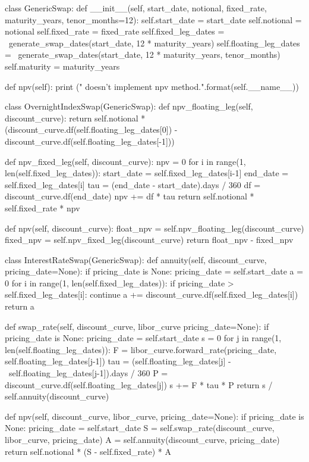 \begin{ipython}
class GenericSwap:
    def __init__(self, start_date, notional,
                 fixed_rate, maturity_years, tenor_months=12):
        self.start_date = start_date        
        self.notional = notional
        self.fixed_rate = fixed_rate
        self.fixed_leg_dates = \
            generate_swap_dates(start_date, 12 * maturity_years)
        self.floating_leg_dates = \
            generate_swap_dates(start_date, 12 * maturity_years, tenor_months)
        self.maturity = maturity_years

    def npv(self):
        print ("{} doesn't implement npv method.".format(self.__name__))

class OvernightIndexSwap(GenericSwap):
    def npv_floating_leg(self, discount_curve):
        return self.notional * (discount_curve.df(self.floating_leg_dates[0]) -
            discount_curve.df(self.floating_leg_dates[-1]))

    def npv_fixed_leg(self, discount_curve):
        npv = 0
        for i in range(1, len(self.fixed_leg_dates)):
            start_date = self.fixed_leg_dates[i-1]
            end_date = self.fixed_leg_dates[i]
            tau = (end_date - start_date).days / 360
            df = discount_curve.df(end_date)
            npv += df * tau 
        return self.notional * self.fixed_rate * npv

    def npv(self, discount_curve):
        float_npv = self.npv_floating_leg(discount_curve)
        fixed_npv = self.npv_fixed_leg(discount_curve)
        return float_npv - fixed_npv

class InterestRateSwap(GenericSwap):
    def annuity(self, discount_curve, pricing_date=None):
        if pricing_date is None:
            pricing_date = self.start_date
        a = 0
        for i in range(1, len(self.fixed_leg_dates)):
            if pricing_date > self.fixed_leg_dates[i]:
                continue
            a += discount_curve.df(self.fixed_leg_dates[i])
        return a

    def swap_rate(self, discount_curve, libor_curve  pricing_date=None):
        if pricing_date is None:
            pricing_date = self.start_date
        s = 0
        for j in range(1, len(self.floating_leg_dates)):
            F = libor_curve.forward_rate(pricing_date, self.floating_leg_dates[j-1])
            tau = (self.floating_leg_dates[j] - \
                self.floating_leg_dates[j-1]).days / 360
            P = discount_curve.df(self.floating_leg_dates[j])
            s += F * tau * P
        return s / self.annuity(discount_curve)

    def npv(self, discount_curve, libor_curve, pricing_date=None):
        if pricing_date is None:
            pricing_date = self.start_date
        S = self.swap_rate(discount_curve, libor_curve, pricing_date)
        A = self.annuity(discount_curve, pricing_date)
        return self.notional * (S - self.fixed_rate) * A
\end{ipython}
